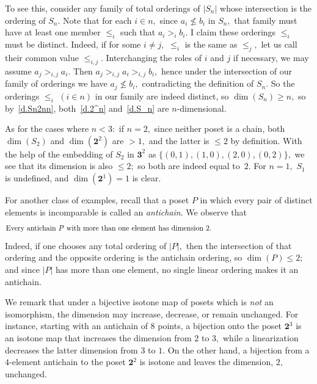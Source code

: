 \documentclass{amsart}
\numberwithin{equation}{section}
\numberwithin{theorem}{section}
\newcommand{\2}{\mathbf{2}}
\begin{document}
To see this, consider any family of total orderings of $|S_n|$
whose intersection is the ordering of $S_n.$
Note that for each $i\in n,$ since $a_i\nleq b_i$ in $S_n,$
that family must have at least one member
$\leq_i$ such that $a_i>_i b_i.$
I claim these orderings $\leq_i$ must be distinct.
Indeed, if for some $i\neq j,$
$\leq_i$ is the same as $\leq_j,$ let us
call their common value $\leq_{i,j}\!.$
Interchanging the roles of $i$ and $j$ if necessary, we may
assume $a_j>_{i,j} a_i.$
Then $a_j >_{i,j} a_i >_{i,j} b_i,$ hence under the intersection
of our family of orderings we have
$a_j\nleq b_i,$ contradicting the definition of $S_n.$
So the orderings $\leq_i$ $(i\in n)$ in our family are indeed distinct,
so $\dim(S_n)\geq n,$ so by~\eqref{d.Sn2nn}, both~\eqref{d.2^n}
and~\eqref{d.S_n} are $\!n\!$-dimensional.

As for the cases where $n<3:$ if $n=2,$ since neither
poset is a chain, both $\dim(S_2)$ and $\dim(\2^2)$ are $>1,$
and the latter is $\leq 2$ by definition.
With the help of the embedding of $S_2$ in $\mathbf{3}^2$ as
$\{(0,1), (1,0), (2,0), (0,2)\},$ we see that its
dimension is also $\leq 2;$ so both are indeed equal to~$2.$
For $n=1,$ $S_1$ is undefined, and $\dim(\2^1)=1$ is clear.

For another class of examples, recall
that a poset $P$ in which every pair of distinct
elements is incomparable is called an {\em antichain}.
We observe that
%
\begin{equation}\begin{minipage}[c]{35pc}\label{d.dim_antichain}
Every antichain $P$ with more than one element has dimension~$2.$
\end{minipage}\end{equation}
%
Indeed, if one chooses any total ordering of $|P|,$ then the
intersection of that ordering and the opposite ordering is
the antichain ordering, so $\dim(P)\leq 2;$
and since $|P|$ has more than one
element, no single linear ordering makes it an antichain.

We remark that under a bijective isotone map of posets which is
{\em not} an isomorphism,
the dimension may increase, decrease, or remain unchanged.
For instance, starting with an antichain of $8$ points,
a bijection onto the poset $\2^3$ is an isotone map
that increases the dimension
from $2$ to $3,$ while a linearization decreases the latter dimension
from $3$ to $1.$
On the other hand, a bijection from a $\!4\!$-element antichain to
the poset $\2^2$ is isotone and leaves the dimension, $2,$ unchanged.
\end{document}
